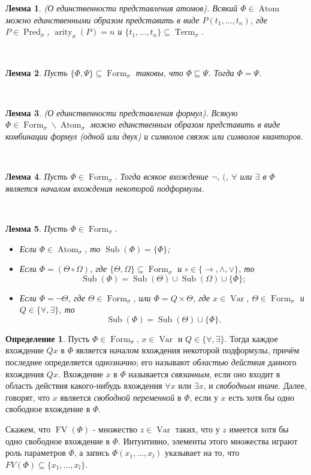 \documentclass[a4paper,100pt]{article}
\theoremstyle{indented}
\newtheorem{lemma}{Лемма}
\theoremstyle{definition}
\newtheorem{defn}{Определение}
\theoremstyle{remark}
\DeclareMathOperator{\ra}{\rightarrow}
\DeclareMathOperator{\form}{Form}
\DeclareMathOperator{\Pred}{Pred}
\DeclareMathOperator{\arity}{arity}
\DeclareMathOperator{\Var}{Var}
\DeclareMathOperator{\Term}{Term}
\DeclareMathOperator{\Sub}{Sub}
\DeclareMathOperator{\Atom}{Atom}
\DeclareMathOperator{\FV}{FV}
\begin{document}
\begin{lemma}
  (О единственности представления атомов). Всякий $\Phi \in \Atom$ можно единственными образом представить в виде $P(t_1, \ldots, t_n)$, где $P\in \Pred_\sigma$, $\arity_\sigma(P)=n$ и $\{t_1, \ldots, t_n\}\subseteq \Term_\sigma$. 
\end{lemma} \ 

\begin{lemma}
  Пусть $\{\Phi, \Psi\}\subseteq \form_\sigma$ таковы, что $\Phi \sqsubseteq \Psi$. Тогда $\Phi = \Psi$. 
\end{lemma} \ 

\begin{lemma}
  (О единственности представления формул). Всякую $\Phi\in \form_\sigma \backslash \Atom_\sigma$ можно единственным образом представить в виде комбинации формул (одной или двух) и символов связок или символов кванторов.
\end{lemma} \ 

\begin{lemma}
  Пусть $\Phi\in \form_\sigma$. Тогда всякое вхождение $\neg$, $($, $\forall$ или $\exists$ в $\Phi$ является началом вхождения некоторой подформулы.
\end{lemma} \ 

\begin{lemma}
  Пусть $\Phi \in \form_\sigma$. 

  \begin{itemize}
    \item Если $\Phi \in \Atom_\sigma$, то $\Sub (\Phi)=\{ \Phi\}$;
    \item Если $\Phi = (\Theta \circ \Omega)$, где $\{\Theta, \Omega\}\subseteq \form_\sigma$ и $\circ \in \{\ra, \wedge, \vee\}$, то 
    \[
      \Sub(\Phi)=\Sub(\Theta)\cup \Sub(\Omega)\cup \{\Phi\};
    \]
    \item Если $\Phi=\neg \Theta$, где $\Theta \in \form_\sigma$, или $\Phi=Q\times \Theta$, где $x\in \Var$, $\Theta \in \form_\sigma$ и $Q\in \{\forall, \exists\}$, то 
    \[
      \Sub(\Phi)= \Sub(\Theta)\cup \{\Phi\}. 
    \]
  \end{itemize}
\end{lemma}

\begin{defn}
  Пусть $\Phi \in \form_\sigma$, $x\in \Var$ и $Q\in \{\forall, \exists\}$. Тогда каждое вхождение $Qx$ в $\Phi$ является началом вхождения некоторой подформулы, причём последнее определяется однозначно; его называют \textit{областью действия} данного вхождения $Qx$. Вхождение $x$ в $\Phi$ называется \textit{связанным}, если оно входит в область действия какого-нибудь вхождения $\forall x$ или $\exists x$, и \textit{свободным} иначе. Далее, говорят, что $x$ является \textit{свободной переменной} в $\Phi$, если у $x$ есть хотя бы одно свободное вхождение в $\Phi$. \ 

  Скажем, что $\FV(\Phi)$ - множество $z\in \Var$ таких, что у $z$ имеется хотя бы одно свободное вхождение в $\Phi$. Интуитивно, элементы этого множества играют роль параметров $\Phi$, а запись $\Phi(x_1, \ldots, x_l)$ указывает на то, что $FV(\Phi)\subseteq \{x_1, \ldots, x_l\}$. 
\end{defn}
\end{document}

